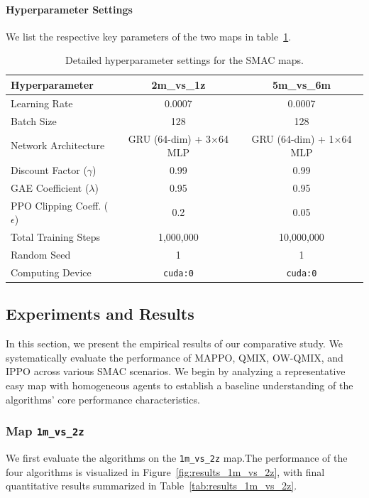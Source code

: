 \paragraph{Hyperparameter Settings}
We list the respective key parameters of the two maps in table~\ref{tab:hyperparameters_detailed}.
\begin{table}[ht]
\centering
\caption{Detailed hyperparameter settings for the SMAC maps.}%
\label{tab:hyperparameters_detailed}
\begin{tabular}{lcc}
\toprule
\textbf{Hyperparameter} & \textbf{2m\_vs\_1z} & \textbf{5m\_vs\_6m} \\
\midrule
Learning Rate & 0.0007 & 0.0007 \\
Batch Size & 128 & 128 \\
Network Architecture & GRU (64-dim) + 3$\times$64 MLP & GRU (64-dim) + 1$\times$64 MLP \\
Discount Factor ($\gamma$) & 0.99 & 0.99 \\
GAE Coefficient ($\lambda$) & 0.95 & 0.95 \\
PPO Clipping Coeff. ($\epsilon$) & 0.2 & 0.05 \\
Total Training Steps & 1,000,000 & 10,000,000 \\
Random Seed & 1 & 1 \\
Computing Device & \texttt{cuda:0} & \texttt{cuda:0} \\
\bottomrule
\end{tabular}
\end{table}

\subsection{Experiments and Results}\label{sec:results}
In this section, we present the empirical results of our comparative study. We systematically evaluate the performance of MAPPO, QMIX, OW-QMIX, and IPPO across various SMAC scenarios. We begin by analyzing a representative easy map with homogeneous agents to establish a baseline understanding of the algorithms' core performance characteristics.

\subsubsection{Map \texttt{1m\_vs\_2z}}
We first evaluate the algorithms on the \texttt{1m\_vs\_2z} map.The performance of the four algorithms is visualized in Figure~\ref{fig:results_1m_vs_2z}, with final quantitative results summarized in Table~\ref{tab:results_1m_vs_2z}.


